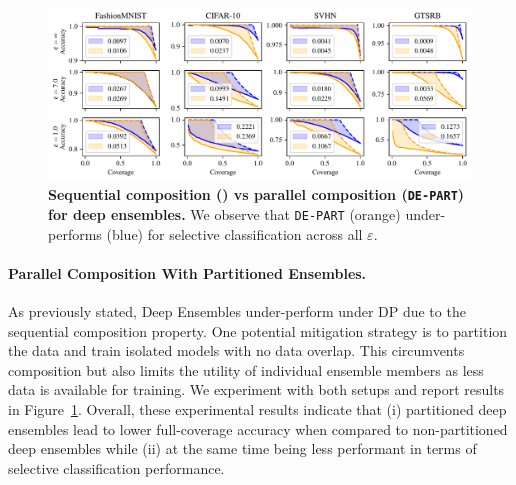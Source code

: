 \begin{figure}[b]
  \centering
  \includegraphics[width=\linewidth]{figs/sptd_dp/cov_acc_de_bound}
\caption[Sequential composition (\de) vs parallel composition (\texttt{DE-PART}) for deep ensembles.]{\textbf{Sequential composition (\de) vs parallel composition (\texttt{DE-PART}) for deep ensembles.} We observe that \texttt{DE-PART} (orange) under-performs \de (blue) for selective classification across all $\varepsilon$.}
\label{fig:acc_cov_bound_de}
\end{figure}

\paragraph{Parallel Composition With Partitioned Ensembles.}

As previously stated, Deep Ensembles under-perform under DP due to the sequential composition property. One potential mitigation strategy is to partition the data and train isolated models with no data overlap. This circumvents composition but also limits the utility of individual ensemble members as less data is available for training. We experiment with both setups and report results in Figure~\ref{fig:acc_cov_bound_de}. Overall, these experimental results indicate that (i) partitioned deep ensembles lead to lower full-coverage accuracy when compared to non-partitioned deep ensembles while (ii) at the same time being less performant in terms of selective classification performance.



